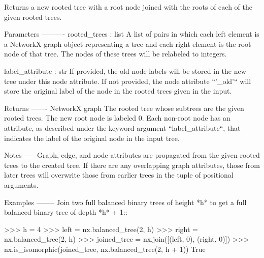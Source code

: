 \begin{DoxyVerb}Returns a new rooted tree with a root node joined with the roots
of each of the given rooted trees.

Parameters
----------
rooted_trees : list
    A list of pairs in which each left element is a NetworkX graph
    object representing a tree and each right element is the root
    node of that tree. The nodes of these trees will be relabeled to
    integers.

label_attribute : str
    If provided, the old node labels will be stored in the new tree
    under this node attribute. If not provided, the node attribute
    ``'_old'`` will store the original label of the node in the
    rooted trees given in the input.

Returns
-------
NetworkX graph
    The rooted tree whose subtrees are the given rooted trees. The
    new root node is labeled 0. Each non-root node has an attribute,
    as described under the keyword argument ``label_attribute``,
    that indicates the label of the original node in the input tree.

Notes
-----
Graph, edge, and node attributes are propagated from the given
rooted trees to the created tree. If there are any overlapping graph
attributes, those from later trees will overwrite those from earlier
trees in the tuple of positional arguments.

Examples
--------
Join two full balanced binary trees of height *h* to get a full
balanced binary tree of depth *h* + 1::

    >>> h = 4
    >>> left = nx.balanced_tree(2, h)
    >>> right = nx.balanced_tree(2, h)
    >>> joined_tree = nx.join([(left, 0), (right, 0)])
    >>> nx.is_isomorphic(joined_tree, nx.balanced_tree(2, h + 1))
    True\end{DoxyVerb}
 